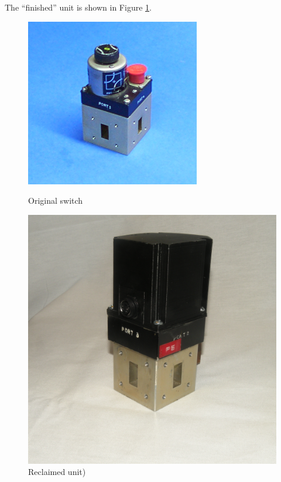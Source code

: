 \documentclass[12pt]{article}
\begin{document}
The ``finished'' unit is shown in Figure \ref{f_wg_switch_new}. 

\begin{figure}[tb]
  \centering
  \begin{minipage}[b]{0.4\textwidth}
    \includegraphics[width=\textwidth]{wr-90-s1.jpg}
    \caption{\label{f_wg_switch_orig}Original switch}  
  \end{minipage}
  \begin{minipage}[b]{0.4\textwidth}
    \includegraphics[width=\textwidth]{WGFinal.jpg}
    \caption{\label{f_wg_switch_new}Reclaimed unit)}      
  \end{minipage}
  \end{figure}
\end{document}
